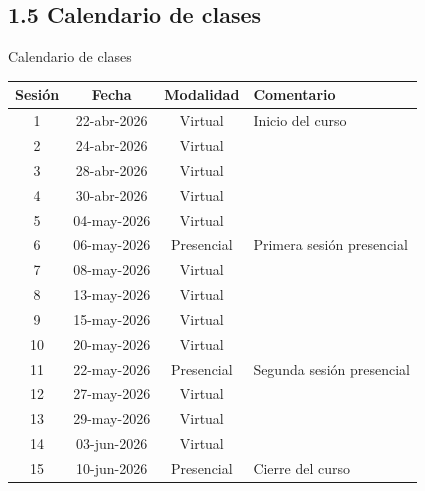 \documentclass{beamer}
\begin{document}
\subsection{1.5 Calendario de clases}
\begin{frame}{Calendario de clases}
\footnotesize
\begin{table}[H]
\centering
\begin{tabular}{c c c l}
\toprule
\textbf{Sesión} & \textbf{Fecha} & \textbf{Modalidad} & \textbf{Comentario} \\
\midrule
1  & 22-abr-2026 & Virtual     & Inicio del curso \\
2  & 24-abr-2026 & Virtual     &  \\
3  & 28-abr-2026 & Virtual     &  \\
4  & 30-abr-2026 & Virtual     &  \\
5  & 04-may-2026 & Virtual     &  \\
6  & 06-may-2026 & Presencial  & Primera sesión presencial \\
7  & 08-may-2026 & Virtual     &  \\
8  & 13-may-2026 & Virtual     &  \\
9  & 15-may-2026 & Virtual     &  \\
10 & 20-may-2026 & Virtual     &  \\
11 & 22-may-2026 & Presencial  & Segunda sesión presencial \\
12 & 27-may-2026 & Virtual     &  \\
13 & 29-may-2026 & Virtual     &  \\
14 & 03-jun-2026 & Virtual     &  \\
15 & 10-jun-2026 & Presencial  & Cierre del curso \\
\bottomrule
\end{tabular}
\end{table}
\end{frame}
\end{document}
